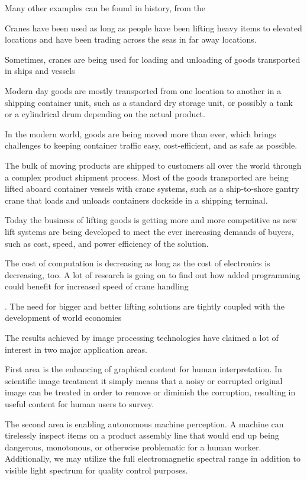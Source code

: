 \documentclass[12pt,a4paper,oneside,pdftex]{report}
\begin{document}
Many other examples can be found in history, from the 

Cranes have been used as long as people have been lifting heavy items to elevated locations and have been trading across the seas in far away locations. 

Sometimes, cranes are being used for loading and unloading of goods transported in ships and vessels




Modern day goods are mostly transported from one location to another in a shipping container unit, such as a standard dry storage unit, or possibly a tank or a cylindrical drum depending on the actual product. 




In the modern world, goods are being moved more than ever, which brings challenges to keeping container traffic easy, cost-efficient, and as safe as possible.

The bulk of moving products are shipped to customers all over the world through a complex product shipment process. Most of the goods transported are being lifted aboard container vessels with crane systems, such as a ship-to-shore gantry crane that loads and unloads containers dockside in a shipping terminal.

Today the business of lifting goods is getting more and more competitive as new lift systems are being developed to meet the ever increasing demands of buyers, such as cost, speed, and power efficiency of the solution.

The cost of computation is decreasing as long as the cost of electronics is decreasing, too. A lot of research is going on to find out how added programming could benefit for increased speed of crane handling

. The need for bigger and better lifting solutions are tightly coupled with the development of world economies 

The results achieved by image processing technologies have claimed a lot of interest in two major application areas.

First area is the enhancing of graphical content for human interpretation. In scientific image treatment it simply means that a noisy or corrupted original image can be treated in order to remove or diminish the corruption, resulting in useful content for human users to survey.

The second area is enabling autonomous machine perception. A machine can tirelessly inspect items on a product assembly line that would end up being dangerous, monotonous, or otherwise problematic for a human worker. Additionally, we may utilize the full electromagnetic spectral range in addition to visible light spectrum for quality control purposes.
 
\end{document}
